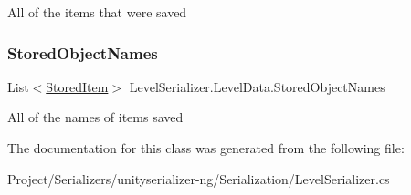 All of the items that were saved 

\mbox{\label{class_level_serializer_1_1_level_data_a9856376db0262a37e33f3c37ff90dcc9}} 
\subsubsection{\texorpdfstring{Stored\+Object\+Names}{StoredObjectNames}}
{\footnotesize\ttfamily List$<$\hyperlink{class_level_serializer_1_1_stored_item}{Stored\+Item}$>$ Level\+Serializer.\+Level\+Data.\+Stored\+Object\+Names}



All of the names of items saved 



The documentation for this class was generated from the following file\+:\begin{DoxyCompactItemize}
\item 
Project/\+Serializers/unityserializer-\/ng/\+Serialization/Level\+Serializer.\+cs\end{DoxyCompactItemize}
